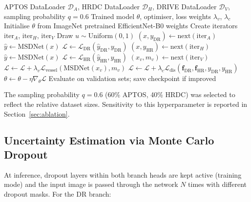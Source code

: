 \documentclass[review,12pt]{elsarticle}
\begin{document}
\begin{algorithm}[htbp]
\caption{MSDNet Multi-Dataset Alternating Training}
\label{alg:training}
\begin{algorithmic}[1]
\Require APTOS DataLoader $\mathcal{D}_A$, HRDC DataLoader $\mathcal{D}_H$,
DRIVE DataLoader $\mathcal{D}_V$, sampling probability $q=0.6$
\Require Trained model $\theta$, optimiser, loss weights
$\lambda_v$, $\lambda_c$
\State Initialise $\theta$ from ImageNet pretrained EfficientNet-B0 weights
  \State Create iterators $\text{iter}_A$, $\text{iter}_H$, $\text{iter}_V$
    \State Draw $u \sim \text{Uniform}(0,1)$
     
      \State $(x, y_{\text{DR}}) \leftarrow \text{next}(\text{iter}_A)$
      \State $\hat{y} \leftarrow \text{MSDNet}(x)$
      \State $\mathcal{L} \leftarrow \mathcal{L}_{\text{DR}}(\hat{y}_{\text{DR}},
        y_{\text{DR}})$
    \Else {}
      \State $(x, y_{\text{HR}}) \leftarrow \text{next}(\text{iter}_H)$
      \State $\hat{y} \leftarrow \text{MSDNet}(x)$
      \State $\mathcal{L} \leftarrow \mathcal{L}_{\text{HR}}(\hat{y}_{\text{HR}},
        y_{\text{HR}})$
    \EndIf
      \State $(x_v, m_v) \leftarrow \text{next}(\text{iter}_V)$
      \State $\mathcal{L} \leftarrow \mathcal{L} +
        \lambda_v \mathcal{L}_{\text{vessel}}(\text{MSDNet}(x_v), m_v)$
    \EndIf
      \State $\mathcal{L} \leftarrow \mathcal{L} +
        \lambda_c \mathcal{L}_{\text{dis}}(\mathbf{f}_{\text{DR}},
        \mathbf{f}_{\text{HR}}, y_{\text{DR}}, y_{\text{HR}})$
    \EndIf
    \State $\theta \leftarrow \theta - \eta \nabla_\theta \mathcal{L}$
  \EndFor
  \State Evaluate on validation sets; save checkpoint if improved
\EndFor
\end{algorithmic}
\end{algorithm}

The sampling probability $q = 0.6$ (60\% APTOS, 40\% HRDC) was selected
to reflect the relative dataset sizes. Sensitivity to this hyperparameter
is reported in Section~\ref{sec:ablation}.

\subsection{Uncertainty Estimation via Monte Carlo Dropout}

At inference, dropout layers within both branch heads are kept active (training
mode) and the input image is passed through the network $N$ times with
different dropout masks. For the DR branch:
\end{document}
